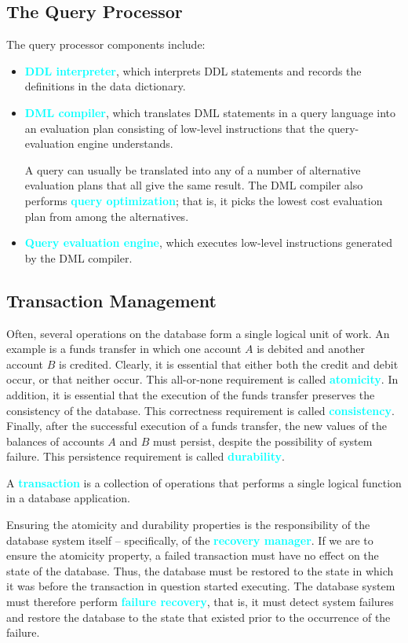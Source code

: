 \documentclass[a4paper,12pt,twoside,openany]{book}
\newcommand{\textcy}[1]{\textbf{\textcolor{cyan}{#1}}}
\begin{document}
\subsection{The Query Processor}

The query processor components include:
\begin{itemize}
    \item\textcy{DDL interpreter}, which interprets DDL statements and records the definitions in the data dictionary.
    \item\textcy{DML compiler}, which translates DML statements in a query language into an evaluation plan consisting of low-level instructions that the query-evaluation engine understands.
    
    \quad A query can usually be translated into any of a number of alternative evaluation plans that all give the same result. The DML compiler also performs \textcy{query optimization}; that is, it picks the lowest cost evaluation plan from among the alternatives.
    \item\textcy{Query evaluation engine}, which executes low-level instructions generated by the DML compiler.
\end{itemize}

\subsection{Transaction Management}

Often, several operations on the database form a single logical unit of work. An example is a funds transfer in which one account $A$ is debited and another account $B$ is credited. Clearly, it is essential that either both the credit and debit occur, or that neither occur. This all-or-none requirement is called \textcy{atomicity}. In addition, it is essential that the execution of the funds transfer preserves the consistency of the database. This correctness requirement is called \textcy{consistency}. Finally, after the successful execution of a funds transfer, the new values of the balances of accounts $A$ and $B$ must persist, despite the possibility of system failure. This persistence requirement is called \textcy{durability}.

A \textcy{transaction} is a collection of operations that performs a single logical function in a database application.

Ensuring the atomicity and durability properties is the responsibility of the database system itself -- specifically, of the \textcy{recovery manager}. If we are to ensure the atomicity property, a failed transaction must have no effect on the state of the database. Thus, the database must be restored to the state in which it was before the transaction in question started executing. The database system must therefore perform \textcy{failure recovery}, that is, it must detect system failures and restore the database to the state that existed prior to the occurrence of the failure.
\end{document}
